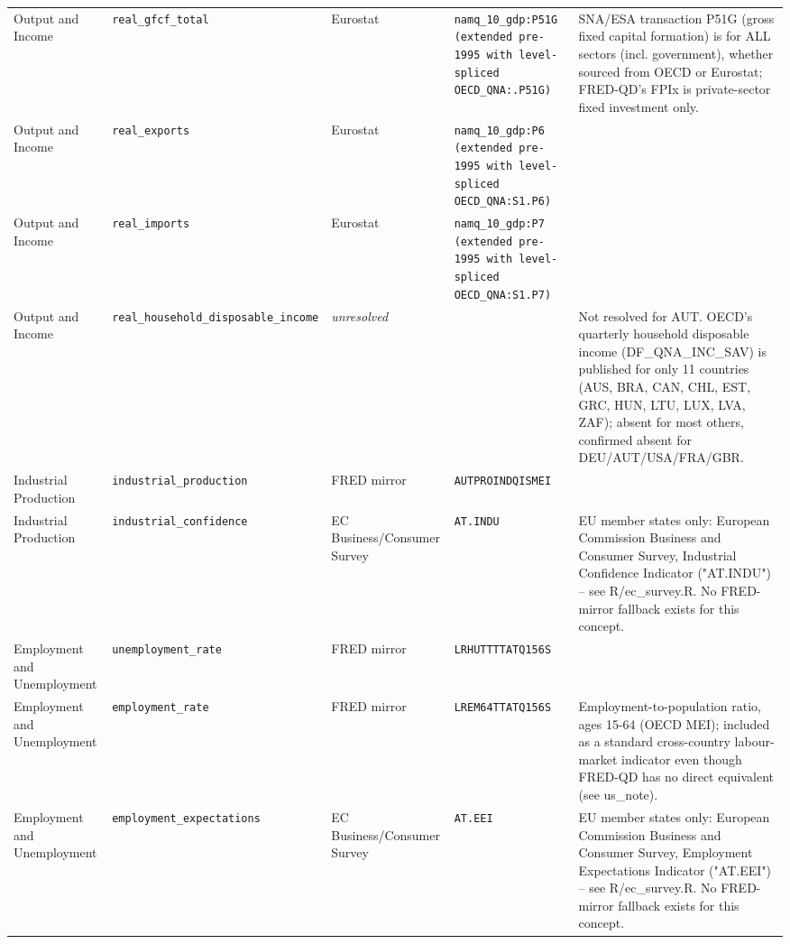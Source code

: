 \documentclass[11pt]{article}
\begin{document}
\begin{landscape}
\begin{longtable}{L{3cm} L{4cm} L{2.6cm} L{3.2cm} L{7.5cm}}
Output and Income & \texttt{real\_\allowbreak{}gfcf\_\allowbreak{}total} & Eurostat & \texttt{namq\_\allowbreak{}10\_\allowbreak{}gdp:\allowbreak{}P51G (extended pre-1995 with level-spliced OECD\_\allowbreak{}QNA:\allowbreak{}.\allowbreak{}P51G)} & SNA/ESA transaction P51G (gross fixed capital formation) is for ALL sectors (incl. government), whether sourced from OECD or Eurostat; FRED-QD's FPIx is private-sector fixed investment only. \\
Output and Income & \texttt{real\_\allowbreak{}exports} & Eurostat & \texttt{namq\_\allowbreak{}10\_\allowbreak{}gdp:\allowbreak{}P6 (extended pre-1995 with level-spliced OECD\_\allowbreak{}QNA:\allowbreak{}S1.\allowbreak{}P6)} &  \\
Output and Income & \texttt{real\_\allowbreak{}imports} & Eurostat & \texttt{namq\_\allowbreak{}10\_\allowbreak{}gdp:\allowbreak{}P7 (extended pre-1995 with level-spliced OECD\_\allowbreak{}QNA:\allowbreak{}S1.\allowbreak{}P7)} &  \\
Output and Income & \texttt{real\_\allowbreak{}household\_\allowbreak{}disposable\_\allowbreak{}income} & \emph{unresolved} & \texttt{} & Not resolved for AUT. OECD's quarterly household disposable income (DF\_QNA\_INC\_SAV) is published for only 11 countries (AUS, BRA, CAN, CHL, EST, GRC, HUN, LTU, LUX, LVA, ZAF); absent for most others, confirmed absent for DEU/AUT/USA/FRA/GBR. \\
Industrial Production & \texttt{industrial\_\allowbreak{}production} & FRED mirror & \texttt{AUTPROINDQISMEI} &  \\
Industrial Production & \texttt{industrial\_\allowbreak{}confidence} & EC Business/Consumer Survey & \texttt{AT.\allowbreak{}INDU} & EU member states only: European Commission Business and Consumer Survey, Industrial Confidence Indicator ("AT.INDU") -- see R/ec\_survey.R. No FRED-mirror fallback exists for this concept. \\
Employment and Unemployment & \texttt{unemployment\_\allowbreak{}rate} & FRED mirror & \texttt{LRHUTTTTATQ156S} &  \\
Employment and Unemployment & \texttt{employment\_\allowbreak{}rate} & FRED mirror & \texttt{LREM64TTATQ156S} & Employment-to-population ratio, ages 15-64 (OECD MEI); included as a standard cross-country labour-market indicator even though FRED-QD has no direct equivalent (see us\_note). \\
Employment and Unemployment & \texttt{employment\_\allowbreak{}expectations} & EC Business/Consumer Survey & \texttt{AT.\allowbreak{}EEI} & EU member states only: European Commission Business and Consumer Survey, Employment Expectations Indicator ("AT.EEI") -- see R/ec\_survey.R. No FRED-mirror fallback exists for this concept. \\

\end{longtable}
\end{landscape}
\end{document}
